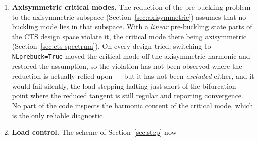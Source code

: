 \documentclass[11pt,a4paper]{article}
\begin{document}
\begin{enumerate}
        second also for two retained modes with the same wave number.
        Eq.~\ref{eq:b-coefficient} is also not index-symmetric, which
        \texttt{multimode\_b\_symmetry.py} takes apart on the Waters shell
        with three modes; the implementation reproduces it unchanged.  It is
        symmetric under $j \leftrightarrow l$ but not under
        $j \leftrightarrow k$, because of its two pairings
        $3\,\phi_{3,ij}\cdot\boldsymbol{\bar{u}}_{kl} +
        3\,\phi_{3,il}\cdot\boldsymbol{\bar{u}}_{jk}$ in place of the three
        $2\,(\phi_{3,ij}\cdot\boldsymbol{\bar{u}}_{kl} +
        \phi_{3,ik}\cdot\boldsymbol{\bar{u}}_{jl} +
        \phi_{3,il}\cdot\boldsymbol{\bar{u}}_{jk})$.  Symmetrised over $j$, $k$
        and $l$, it equals the three-pairing form to $10^{-15}$, so the two
        agree wherever $b_{ijkl}$ is contracted with $\xi_j\xi_k\xi_l$, as in
        the amplitude equations, and for $i = j = k = l$; single entries do
        not, $b_{1122}$ being $-0.125$ against $-0.102$ symmetrised with
        \texttt{NLprebuck=True}.  Its dependence on $i$ is the per-equation
        factor $-1/(6\lambda_i\,\phi_{20,i}\cdot\delta\boldsymbol{\bar{u}}_i)$:
        multiplied back by it and symmetrised over $j$, $k$ and $l$, the
        coefficients are symmetric in all four indices to about $10^{-10}$, the size
        of the terms in $a_{ijk}$.  Those terms have irregular index patterns,
        $a_{iij}a_{ikl}$ appearing twice, which nothing checks as long as
        $a_{ijk}$ vanishes.
  \item \textbf{Axisymmetric critical modes.}  The reduction of the
        pre-buckling problem to the axisymmetric subspace
        (Section~\ref{sec:axisymmetric}) assumes that no buckling mode lies
        in that subspace.  With a \emph{linear} pre-buckling state parts of
        the CTS design space violate it, the critical mode there being
        axisymmetric (Section~\ref{sec:cts-spectrum}).  On every design
        tried, switching to \texttt{NLprebuck=True} moved the critical mode
        off the axisymmetric harmonic and restored the assumption, so the
        violation has not been observed where the reduction is actually
        relied upon --- but it has not been \emph{excluded} either, and it
        would fail silently, the load stepping halting just short of the
        bifurcation point where the reduced tangent is still regular and
        reporting convergence.  No part of the code inspects the harmonic
        content of the critical mode, which is the only reliable
        diagnostic.
  \item \textbf{Load control.}  The scheme of Section~\ref{sec:step} now

\end{enumerate}
\end{document}
